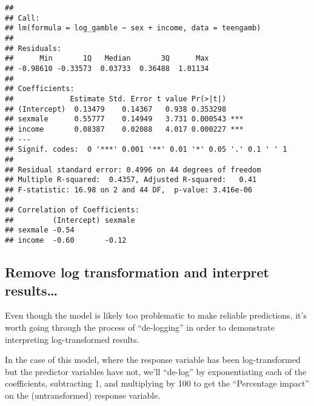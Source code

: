 \documentclass[
]{article}
\newenvironment{Shaded}{\begin{snugshade}}{\end{snugshade}}
\newcommand{\DecValTok}[1]{\textcolor[rgb]{0.00,0.00,0.81}{#1}}
\newcommand{\FunctionTok}[1]{\textcolor[rgb]{0.00,0.00,0.00}{#1}}
\newcommand{\NormalTok}[1]{#1}
\newcommand{\OtherTok}[1]{\textcolor[rgb]{0.56,0.35,0.01}{#1}}
\newcommand{\SpecialCharTok}[1]{\textcolor[rgb]{0.00,0.00,0.00}{#1}}
\newcommand{\StringTok}[1]{\textcolor[rgb]{0.31,0.60,0.02}{#1}}
\begin{document}
\begin{verbatim}
## 
## Call:
## lm(formula = log_gamble ~ sex + income, data = teengamb)
## 
## Residuals:
##      Min       1Q   Median       3Q      Max 
## -0.98610 -0.33573  0.03733  0.36488  1.01134 
## 
## Coefficients:
##             Estimate Std. Error t value Pr(>|t|)    
## (Intercept)  0.13479    0.14367   0.938 0.353298    
## sexmale      0.55777    0.14949   3.731 0.000543 ***
## income       0.08387    0.02088   4.017 0.000227 ***
## ---
## Signif. codes:  0 '***' 0.001 '**' 0.01 '*' 0.05 '.' 0.1 ' ' 1
## 
## Residual standard error: 0.4996 on 44 degrees of freedom
## Multiple R-squared:  0.4357, Adjusted R-squared:   0.41 
## F-statistic: 16.98 on 2 and 44 DF,  p-value: 3.416e-06
## 
## Correlation of Coefficients:
##         (Intercept) sexmale
## sexmale -0.54              
## income  -0.60       -0.12
\end{verbatim}

\hypertarget{remove-log-transformation-and-interpret-results}{%
\subsection{Remove log transformation and interpret
results\ldots{}}\label{remove-log-transformation-and-interpret-results}}

Even though the model is likely too problematic to make reliable
predictions, it's worth going through the process of ``de-logging'' in
order to demonstrate interpreting log-transformed results.

In the case of this model, where the response variable has been
log-transformed but the predictor variables have not, we'll ``de-log''
by exponentiating each of the coefficients, subtracting 1, and
multiplying by 100 to get the ``Percentage impact'' on the
(untransformed) response variable.

\begin{Shaded}
\end{Shaded}
\end{document}
